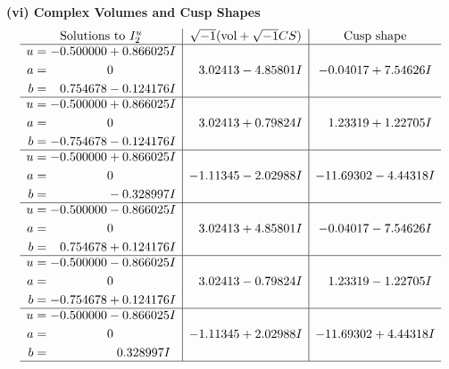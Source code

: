 \documentclass[1p]{elsarticle_modified}
\theoremstyle{definition}
\newcommand{\I}{\sqrt{-1}}
\begin{document}
\newpage\flushleft \textbf{(vi) Complex Volumes and Cusp Shapes}
$$\begin{array}{c|c|c}  
\text{Solutions to }I^u_{2}& \I (\text{vol} + \sqrt{-1}CS) & \text{Cusp shape}\\
 \hline 
\begin{aligned}
u &= -0.500000 + 0.866025 I \\
a &= \phantom{-0.000000 } 0 \\
b &= \phantom{-}0.754678 - 0.124176 I\end{aligned}
 & \phantom{-}3.02413 - 4.85801 I & -0.04017 + 7.54626 I \\ \hline\begin{aligned}
u &= -0.500000 + 0.866025 I \\
a &= \phantom{-0.000000 } 0 \\
b &= -0.754678 - 0.124176 I\end{aligned}
 & \phantom{-}3.02413 + 0.79824 I & \phantom{-}1.23319 + 1.22705 I \\ \hline\begin{aligned}
u &= -0.500000 + 0.866025 I \\
a &= \phantom{-0.000000 } 0 \\
b &= \phantom{-0.000000 } -0.328997 I\end{aligned}
 & -1.11345 - 2.02988 I & -11.69302 - 4.44318 I \\ \hline\begin{aligned}
u &= -0.500000 - 0.866025 I \\
a &= \phantom{-0.000000 } 0 \\
b &= \phantom{-}0.754678 + 0.124176 I\end{aligned}
 & \phantom{-}3.02413 + 4.85801 I & -0.04017 - 7.54626 I \\ \hline\begin{aligned}
u &= -0.500000 - 0.866025 I \\
a &= \phantom{-0.000000 } 0 \\
b &= -0.754678 + 0.124176 I\end{aligned}
 & \phantom{-}3.02413 - 0.79824 I & \phantom{-}1.23319 - 1.22705 I \\ \hline\begin{aligned}
u &= -0.500000 - 0.866025 I \\
a &= \phantom{-0.000000 } 0 \\
b &= \phantom{-0.000000 -}0.328997 I\end{aligned}
 & -1.11345 + 2.02988 I & -11.69302 + 4.44318 I\\
 \hline 
 \end{array}$$\newpage\newpage\renewcommand{\arraystretch}{1}
\end{document}

